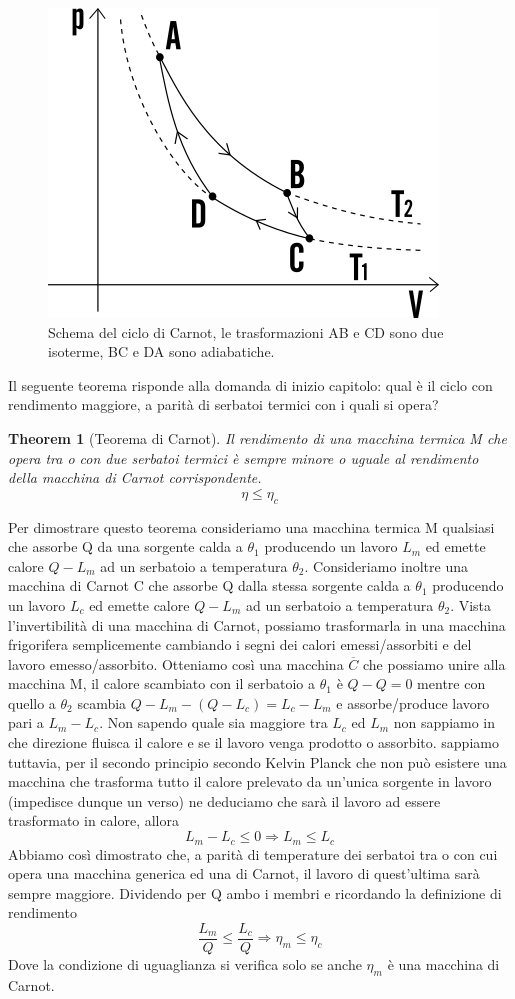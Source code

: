 \documentclass[10pt,a4paper]{article}
\newtheorem{theorem}{Theorem}
\begin{document}
\begin{figure}[h!]
	\centering
	\includegraphics[width=0.5\linewidth]{../images/ciclo_carnot}
	\caption{Schema del ciclo di Carnot, le trasformazioni AB e CD sono due isoterme, BC e DA sono adiabatiche.}
	\label{fig:ciclocarnot}
\end{figure}
\FloatBarrier
Il seguente teorema risponde alla domanda di inizio capitolo: qual è il ciclo con rendimento maggiore, a parità di serbatoi termici con i quali si opera? 
\begin{theorem}[Teorema di Carnot]
	Il rendimento di una macchina termica M che opera tra o con due serbatoi termici è sempre minore o uguale al rendimento della macchina di Carnot corrispondente.
	\[\eta \leq \eta_c\]
\end{theorem}
Per dimostrare questo teorema consideriamo una macchina termica M qualsiasi che assorbe Q da una sorgente calda a $\theta_1$ producendo un lavoro $L_m$ ed emette calore $Q-L_m$ ad un serbatoio a temperatura $\theta_2$. Consideriamo inoltre una macchina di Carnot C che assorbe Q dalla stessa sorgente calda a $\theta_1$ producendo un lavoro $L_c$ ed emette calore $Q-L_m$ ad un serbatoio a temperatura $\theta_2$. Vista l'invertibilità di una macchina di Carnot, possiamo trasformarla in una macchina frigorifera semplicemente cambiando i segni dei calori emessi/assorbiti e del lavoro emesso/assorbito. Otteniamo così una macchina $\overline{C}$ che possiamo unire alla macchina M, il calore scambiato con il serbatoio a $\theta_1$ è \(Q-Q = 0\) mentre con quello a $\theta_2$ scambia \(Q-L_m - (Q-L_c) = L_c-L_m\) e assorbe/produce lavoro pari a \(L_m-L_c\). Non sapendo quale sia maggiore tra \(L_c\) ed \(L_m\) non sappiamo in che direzione fluisca il calore e se il lavoro venga prodotto o assorbito. sappiamo tuttavia, per il secondo principio secondo Kelvin Planck che non può esistere una macchina che trasforma tutto il calore prelevato da un'unica sorgente in lavoro (impedisce dunque un verso) ne deduciamo che sarà il lavoro ad essere trasformato in calore, allora \[L_m-L_c \leq 0 \Rightarrow L_m \leq L_c\] Abbiamo così dimostrato che, a parità di temperature dei serbatoi tra o con cui opera una macchina generica ed una di Carnot, il lavoro di quest'ultima sarà sempre maggiore. Dividendo per Q ambo i membri e ricordando la definizione di rendimento
\[\frac{L_m }{Q} \leq \frac{L_c}{Q} \Rightarrow \eta_m \leq \eta_c\]
Dove la condizione di uguaglianza si verifica solo se anche $\eta_m$ è una macchina di Carnot.
\end{document}
